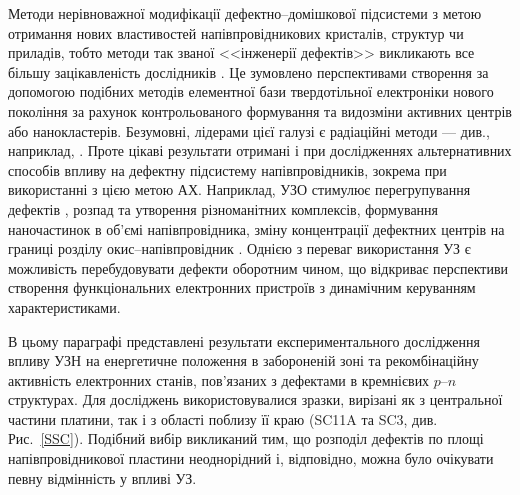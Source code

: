 Методи нерівноважної модифікації дефектно--домішкової підсистеми з метою отримання нових властивостей напівпровідникових
кристалів, структур чи приладів, тобто методи так званої <<інженерії дефектів>> викликають все більшу зацікавленість дослідників \cite{Smirnov}.
Це зумовлено перспективами  створення за допомогою подібних методів елементної бази твердотільної
електроніки нового покоління за рахунок контрольованого формування та видозміни активних центрів або нанокластерів.
Безумовні, лідерами цієї галузі є радіаційні методи --- див., наприклад, \cite{Kozlovs,DefImplan}.
Проте цікаві результати отримані і при дослідженнях альтернативних способів впливу на дефектну підсистему напівпровідників,
зокрема при використанні з цією метою АХ.
Наприклад, УЗО стимулює перегрупування дефектів \cite{ZobovFTP2008}, розпад \cite{PodolHivr} та утворення \cite{YOlikh2006TPLr} різноманітних комплексів,
формування наночастинок \cite{Roman:2006JAP} в об'ємі напівпровідника,
зміну концентрації дефектних центрів на границі розділу окис--напівпровідник \cite{Parchinskii2006r}.
Однією з переваг використання УЗ є можливість перебудовувати дефекти оборотним чином, що відкриває
перспективи створення функціональних електронних пристроїв з динамічним керуванням характеристиками.

В цьому параграфі представлені результати експериментального дослідження впливу УЗН на енергетичне положення в забороненій зоні та
рекомбінаційну активність електронних станів, пов'язаних з дефектами в кремнієвих $p$--$n$ структурах.
Для досліджень використовувалися зразки, вирізані як з центральної частини платини, так і з області поблизу її краю (SC11A та SC3, див. Рис.~\ref{SSC}).
Подібний вибір викликаний тим, що розподіл дефектів по площі напівпровідникової пластини неоднорідний і, відповідно, можна було очікувати
певну відмінність у впливі УЗ.

